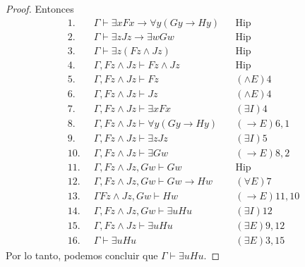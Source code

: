 \documentclass[letterpaper,11pt]{article}
\begin{document}
\begin{enumerate}
\begin{itemize}
\begin{proof}
                Entonces
                \begin{align*}
                    1. \; \; &\Gamma \vdash \exists x Fx \rightarrow 
                    \forall y(Gy \rightarrow Hy)
                    && \text{Hip} \\
                    2. \; \; &\Gamma \vdash \exists z Jz \rightarrow 
                    \exists w Gw
                    && \text{Hip} \\
                    3. \; \; &\Gamma \vdash \exists z(Fz \land Jz)
                    && \text{Hip} \\
                    4. \; \; &\Gamma, Fz \land Jz \vdash Fz \land Jz
                    && \text{Hip} \\
                    5. \; \; &\Gamma, Fz \land Jz \vdash Fz 
                    && \text{$(\land E) 4$} \\
                    6. \; \; &\Gamma, Fz \land Jz \vdash Jz
                    && \text{$(\land E) 4$} \\
                    7. \; \; &\Gamma, Fz \land Jz \vdash \exists x Fx
                    && \text{$(\exists I) 4$} \\
                    8. \; \; &\Gamma, Fz \land Jz \vdash \forall y(Gy 
                    \rightarrow Hy)
                    && \text{$(\rightarrow E) 6,1$} \\
                    9. \; \; &\Gamma, Fz \land Jz \vdash \exists z Jz
                    && \text{$(\exists I) 5$} \\
                    10. \; \; &\Gamma, Fz \land Jz \vdash \exists Gw
                    && \text{$(\rightarrow E) 8, 2$} \\
                    11. \; \;  &\Gamma, Fz \land Jz, Gw \vdash Gw 
                    && \text{Hip} \\
                    12. \; \; &\Gamma, Fz \land Jz, Gw \vdash Gw \rightarrow Hw
                    && \text{$(\forall E) 7$} \\
                    13. \; \; &\Gamma Fz \land Jz, Gw \vdash Hw 
                    && \text{$(\rightarrow E) 11,10$} \\
                    14. \; \; &\Gamma, Fz \land Jz, Gw \vdash \exists u Hu
                    && \text{$(\exists I) 12$} \\
                    15. \; \; &\Gamma, Fz \land Jz \vdash \exists u Hu
                    && \text{$(\exists E) 9, 12$} \\
                    16. \; \; &\Gamma \vdash \exists u Hu 
                    && \text{$(\exists E) 3, 15$}
                \end{align*}
                Por lo tanto, podemos concluir que $\Gamma \vdash \exists u Hu$.
            \end{proof}

        \end{itemize}
    \end{enumerate}
\end{document}

